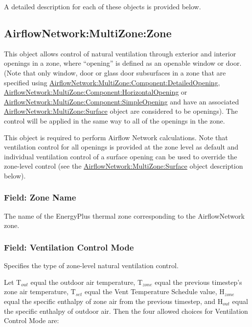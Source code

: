 A detailed description for each of these objects is provided below.

\subsection{AirflowNetwork:MultiZone:Zone}\label{airflownetworkmultizonezone}

This object allows control of natural ventilation through exterior and interior openings in a zone, where ``opening'' is defined as an openable window or door. (Note that only window, door or glass door subsurfaces in a zone that are specified using \hyperref[airflownetworkmultizonecomponentdetailedopening]{AirflowNetwork:MultiZone:Component:DetailedOpening}, \hyperref[airflownetworkmultizonecomponenthorizontalopening]{AirflowNetwork:MultiZone:Component:HorizontalOpening} or \hyperref[airflownetworkmultizonecomponentsimpleopening]{AirflowNetwork:MultiZone:Component:SimpleOpening} and have an associated \hyperref[airflownetworkmultizonesurface]{AirflowNetwork:MultiZone:Surface} object are considered to be openings). The control will be applied in the same way to all of the openings in the zone.

This object is required to perform Airflow Network calculations. Note that ventilation control for all openings is provided at the zone level as default and individual ventilation control of a surface opening can be used to override the zone-level control (see the \hyperref[airflownetworkmultizonesurface]{AirflowNetwork:MultiZone:Surface} object description below).

\subsubsection{Field: Zone Name}\label{field-zone-name-001}

The name of the EnergyPlus thermal zone corresponding to the AirflowNetwork zone.

\subsubsection{Field: Ventilation Control Mode}\label{field-ventilation-control-mode}

Specifies the type of zone-level natural ventilation control.

Let T\(_{out}\) equal the outdoor air temperature, T\(_{zone}\) equal the previous timestep's zone air temperature, T\(_{set}\) equal the Vent Temperature Schedule value, H\(_{zone}\) equal the specific enthalpy of zone air from the previous timestep, and H\(_{out}\) equal the specific enthalpy of outdoor air. Then the four allowed choices for Ventilation Control Mode are:

